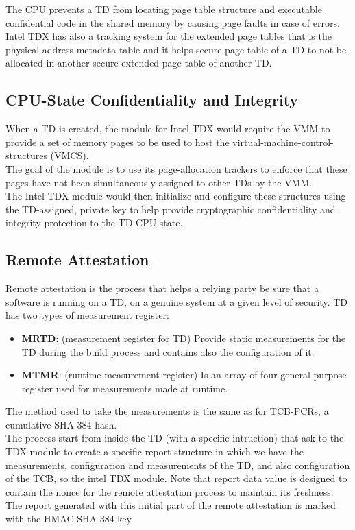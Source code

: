 The CPU prevents a TD from locating page table structure and executable confidential code in the shared memory by causing page faults in case of errors. \\
Intel TDX has also a tracking system for the extended page tables that is the physical address metadata table and it helps secure page table of a TD to not be allocated in another secure extended page table of another TD.


\subsection{CPU-State Confidentiality and Integrity}
When a TD is created, the module for Intel TDX would require the VMM to provide a set of memory pages to be used to host the virtual-machine-control-structures (VMCS). \\
The goal of the module is to use its page-allocation trackers to enforce that these pages have not been simultaneously assigned to other TDs by the VMM. \\
The Intel-TDX module would then initialize and configure these structures using the TD-assigned, private key to help provide cryptographic confidentiality and integrity protection to the TD-CPU state.


\subsection{Remote Attestation}
Remote attestation is the process that helps a relying party be sure that a software is running on a TD, on a genuine system at a given level of security. TD has two types of measurement register:
\begin{itemize}
    \item \textbf{MRTD}: (measurement register for TD) Provide static measurements for the TD during the build process and contains also the configuration of it.
    \item \textbf{MTMR}: (runtime measurement register) Is an array of four general purpose register used for measurements made at runtime.
\end{itemize}
The method used to take the measurements is the same as for TCB-PCRs, a cumulative SHA-384 hash. \\
The process start from inside the TD (with a specific intruction) that ask to the TDX module to create a specific report structure in which we have the measurements, configuration and measurements of the TD, and also configuration of the TCB, so the intel TDX module. Note that report data value is designed to contain the nonce for the remote attestation process to maintain its freshness. \\
The report generated with this initial part of the remote attestation is marked with the HMAC SHA-384 key

